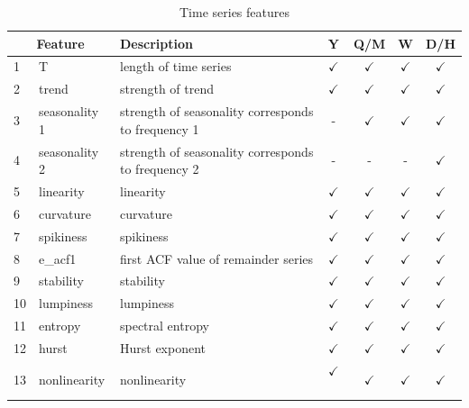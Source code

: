 \documentclass[11pt,a4paper,]{article}
\def\yes{$\checkmark$}
\begin{document}
\begin{table}[!htp]
\centering\footnotesize\tabcolsep=0.12cm
\caption{Time series features}
\label{feature}
\begin{tabular}{llp{}cccc}
\toprule
\multicolumn{2}{c}{Feature} & Description & Y & Q/M & W & D/H\\
\midrule
1  & T              & length of time series                                                                   & \yes  & \yes & \yes & \yes\\
2  & trend          & strength of trend                                                                       & \yes  & \yes & \yes & \yes\\
3  & seasonality 1    & strength of seasonality corresponds to frequency 1                                                              & -     & \yes & \yes & \yes\\
4  & seasonality 2    & strength of seasonality corresponds to frequency 2                                                              & -     & - & -& \yes\\
5  & linearity      & linearity                                                                               & \yes  & \yes & \yes & \yes\\
6  & curvature      & curvature                                                                               & \yes  & \yes & \yes & \yes\\
7  & spikiness      & spikiness                                                                               & \yes  & \yes & \yes & \yes\\
8  & e\_acf1        & first ACF value of remainder series                                                     & \yes  & \yes & \yes & \yes\\
9  & stability      & stability                                                                               & \yes  & \yes & \yes & \yes\\
10  & lumpiness      & lumpiness                                                                               & \yes  & \yes & \yes & \yes\\
11 & entropy        & spectral entropy                                                                        & \yes  & \yes & \yes & \yes\\
12 & hurst          & Hurst exponent                                                                          & \yes  & \yes & \yes & \yes\\
13 & nonlinearity   & nonlinearity                                                                            & \yes\ & \yes & \yes & \yes\\

\end{tabular}
\end{table}
\end{document}
